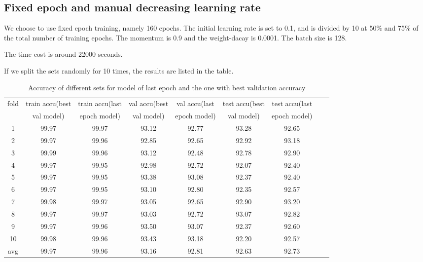 \subsection{Fixed epoch and manual decreasing learning rate}
We choose to use fixed epoch training, namely 160 epochs.
The initial learning rate is set to 0.1, and is divided by 10 at 50\% and 75\% of the total number of training epochs.
The momentum is 0.9 and the weight-dacay is 0.0001. The batch size is 128.

The time cost is around 22000 seconds.

If we split the sets randomly for 10 times, the results are listed in the table.
\begin{table}[!htbp]
	\centering
	\caption{Accuracy of different sets for model of  last epoch and the one with best validation accuracy }
	\label{table:cv3}
	\begin{tabular}{|c|c|c|c|c|c|c|c|c|}
		\hline
%		
fold	&	train accu(best	&	train accu(last	&	val accu(best	&	val accu(last	&	test accu(best 	&	test accu(last	\\
	&	 val model)	&	 epoch model)	&	val model)	&	 epoch model)	&	val model)	&	 epoch model)	\\\hline
1	&	99.97	&	99.97	&	93.12	&	92.77	&	93.28	&	92.65	\\\hline
2	&	99.97	&	99.96	&	92.85	&	92.65	&	92.92	&	93.18	\\\hline
3	&	99.99	&	99.96	&	93.12	&	92.48	&	92.78	&	92.90	\\\hline
4	&	99.97	&	99.95	&	92.98	&	92.72	&	92.07	&	92.40	\\\hline
5	&	99.97	&	99.95	&	93.38	&	93.08	&	92.37	&	92.40	\\\hline
6	&	99.97	&	99.95	&	93.10	&	92.80	&	92.35	&	92.57	\\\hline
7	&	99.98	&	99.97	&	93.05	&	92.65	&	92.90	&	93.20	\\\hline
8	&	99.97	&	99.97	&	93.03	&	92.72	&	93.07	&	92.82	\\\hline
9	&	99.97	&	99.96	&	93.50	&	93.07	&	92.37	&	92.60	\\\hline
10	&	99.98	&	99.96	&	93.43	&	93.18	&	92.20	&	92.57	\\\hline
avg	&	99.97	&	99.96	&	93.16	&	92.81	&	92.63	&	92.73	\\\hline
	\end{tabular}
\end{table}



